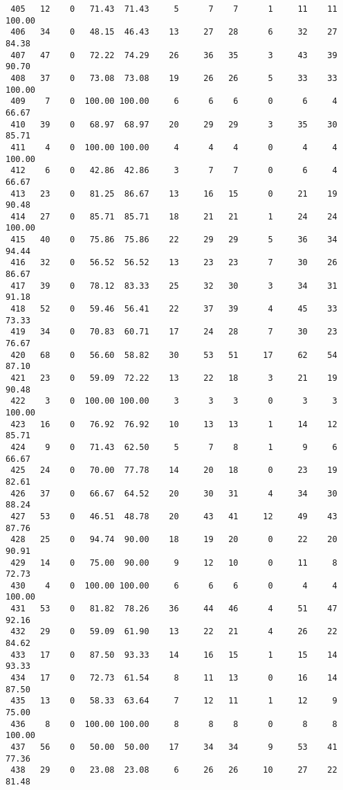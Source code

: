 \begin{verbatim}
 405   12    0   71.43  71.43     5      7    7      1     11    11   100.00
 406   34    0   48.15  46.43    13     27   28      6     32    27    84.38
 407   47    0   72.22  74.29    26     36   35      3     43    39    90.70
 408   37    0   73.08  73.08    19     26   26      5     33    33   100.00
 409    7    0  100.00 100.00     6      6    6      0      6     4    66.67
 410   39    0   68.97  68.97    20     29   29      3     35    30    85.71
 411    4    0  100.00 100.00     4      4    4      0      4     4   100.00
 412    6    0   42.86  42.86     3      7    7      0      6     4    66.67
 413   23    0   81.25  86.67    13     16   15      0     21    19    90.48
 414   27    0   85.71  85.71    18     21   21      1     24    24   100.00
 415   40    0   75.86  75.86    22     29   29      5     36    34    94.44
 416   32    0   56.52  56.52    13     23   23      7     30    26    86.67
 417   39    0   78.12  83.33    25     32   30      3     34    31    91.18
 418   52    0   59.46  56.41    22     37   39      4     45    33    73.33
 419   34    0   70.83  60.71    17     24   28      7     30    23    76.67
 420   68    0   56.60  58.82    30     53   51     17     62    54    87.10
 421   23    0   59.09  72.22    13     22   18      3     21    19    90.48
 422    3    0  100.00 100.00     3      3    3      0      3     3   100.00
 423   16    0   76.92  76.92    10     13   13      1     14    12    85.71
 424    9    0   71.43  62.50     5      7    8      1      9     6    66.67
 425   24    0   70.00  77.78    14     20   18      0     23    19    82.61
 426   37    0   66.67  64.52    20     30   31      4     34    30    88.24
 427   53    0   46.51  48.78    20     43   41     12     49    43    87.76
 428   25    0   94.74  90.00    18     19   20      0     22    20    90.91
 429   14    0   75.00  90.00     9     12   10      0     11     8    72.73
 430    4    0  100.00 100.00     6      6    6      0      4     4   100.00
 431   53    0   81.82  78.26    36     44   46      4     51    47    92.16
 432   29    0   59.09  61.90    13     22   21      4     26    22    84.62
 433   17    0   87.50  93.33    14     16   15      1     15    14    93.33
 434   17    0   72.73  61.54     8     11   13      0     16    14    87.50
 435   13    0   58.33  63.64     7     12   11      1     12     9    75.00
 436    8    0  100.00 100.00     8      8    8      0      8     8   100.00
 437   56    0   50.00  50.00    17     34   34      9     53    41    77.36
 438   29    0   23.08  23.08     6     26   26     10     27    22    81.48

\end{verbatim}
